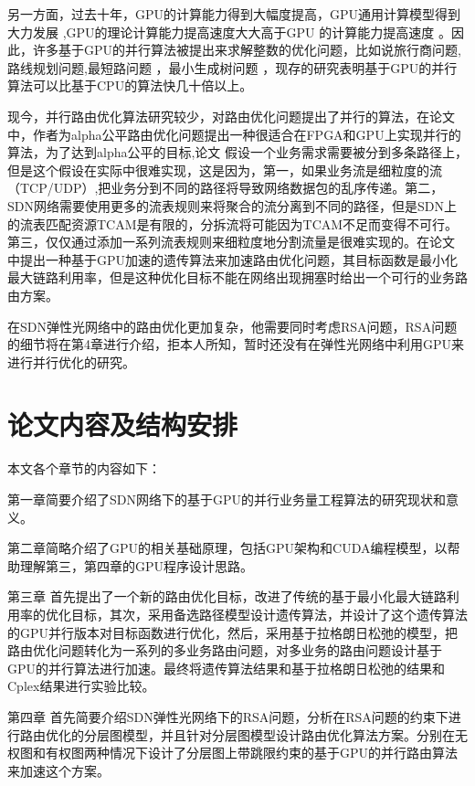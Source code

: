 \documentclass[master]{thesis-uestc}
\begin{document}
另一方面，过去十年，GPU的计算能力得到大幅度提高，GPU通用计算模型得到大力发展 \cite{GPUdeve, CUDA},GPU的理论计算能力提高速度大大高于GPU 的计算能力提高速度 \cite{GPUdeve}。因此，许多基于GPU的并行算法被提出来求解整数的优化问题，比如说旅行商问题\cite{TSP},路线规划问题\cite{VRP},最短路问题 \cite{SSP1, SSP2}，最小生成树问题 \cite{MST}，现存的研究\cite{TSP, VRP, SSP1, SSP2, MST}表明基于GPU的并行算法可以比基于CPU的算法快几十倍以上。

 现今，并行路由优化算法研究较少，\cite{ParaTE1, ParaTE2}对路由优化问题提出了并行的算法，在论文\cite{ParaTE1}中，作者为alpha公平路由优化问题提出一种很适合在FPGA和GPU上实现并行的算法，为了达到alpha公平的目标,论文 \cite {ParaTE1}假设一个业务需求需要被分到多条路径上，但是这个假设在实际中很难实现，这是因为，第一，如果业务流是细粒度的流（TCP/UDP）,把业务分到不同的路径将导致网络数据包的乱序传递。第二，SDN网络需要使用更多的流表规则来将聚合的流分离到不同的路径，但是SDN上的流表匹配资源TCAM是有限的，分拆流将可能因为TCAM不足而变得不可行。第三，仅仅通过添加一系列流表规则来细粒度地分割流量是很难实现的。在论文 \cite{ParaTE2}中提出一种基于GPU加速的遗传算法来加速路由优化问题，其目标函数是最小化最大链路利用率，但是这种优化目标不能在网络出现拥塞时给出一个可行的业务路由方案。

 在SDN弹性光网络中的路由优化更加复杂，他需要同时考虑RSA问题，RSA问题的细节将在第4章进行介绍，拒本人所知，暂时还没有在弹性光网络中利用GPU来进行并行优化的研究。
\section{论文内容及结构安排}
本文各个章节的内容如下：

    第一章简要介绍了SDN网络下的基于GPU的并行业务量工程算法的研究现状和意义。

    第二章简略介绍了GPU的相关基础原理，包括GPU架构和CUDA编程模型，以帮助理解第三，第四章的GPU程序设计思路。

    第三章 首先提出了一个新的路由优化目标，改进了传统的基于最小化最大链路利用率的优化目标，其次，采用备选路径模型设计遗传算法，并设计了这个遗传算法的GPU并行版本对目标函数进行优化，然后，采用基于拉格朗日松弛的模型，把路由优化问题转化为一系列的多业务路由问题，对多业务的路由问题设计基于GPU的并行算法进行加速。最终将遗传算法结果和基于拉格朗日松弛的结果和Cplex结果进行实验比较。

    第四章 首先简要介绍SDN弹性光网络下的RSA问题，分析在RSA问题的约束下进行路由优化的分层图模型，并且针对分层图模型设计路由优化算法方案。分别在无权图和有权图两种情况下设计了分层图上带跳限约束的基于GPU的并行路由算法来加速这个方案。



\end{document}
